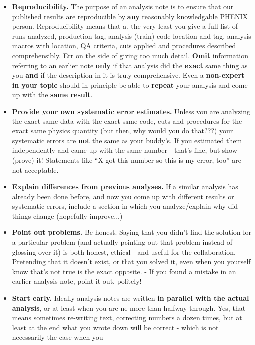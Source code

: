 \documentclass[12pt]{article}
\begin{document}
\begin{itemize}
\item{{\bf Reproducibility.}
  The purpose of an analysis note is to ensure that our published
  results are reproducible by {\bf any} reasonably knowledgable PHENIX
  person. 
  Reproducibility means that at the very least you give a full
  list of runs analyzed, production tag, analysis (train) code
  location and tag, analysis macros with location, QA criteria, cuts
  applied  and procedures  described comprehensibly.  Err on the side
  of giving too much detail.  {\bf Omit} information referring to an earlier 
  note {\bf only} if that analysis did
  the {\bf exact} same thing as you {\bf and} if the description in it is
  truly comprehensive.  Even a 
  {\bf non-expert in your topic} should in principle be able to
  {\bf repeat} your analysis and come up with the {\bf same result}.}
\item{{\bf Provide your own systematic error estimates.}
  Unless you are analyzing the exact same data with the exact same
  code, cuts and procedures for the exact same physics quantity (but
  then, why would you do that???) your systematic errors are {\bf not}
  the same as your buddy's.  If you estimated them independently and
  came up with the same number - that's fine, but show (prove) it!  
  Statements like ``X got this number so this is my error, too'' are not 
  acceptable.}
\item{{\bf Explain differences from previous analyses.}
  If a similar analysis has already been done before, and now you
  come up with different results or systematic errors, include a
  section in which you analyze/explain
  why did things change (hopefully improve...)}
\item{{\bf Point out problems.}
  Be honest.  Saying that you didn't find the solution for a
  particular problem (and actually pointing out that problem instead
  of glossing over it) is both honest, ethical - and useful for the
  collaboration.  Pretending that it doesn't exist, or that you solved
  it, even when you yourself know that's not true is the exact
  opposite. - If you found a mistake in an earlier analysis note,
  point it out, politely!}
\item{{\bf Start early.}
  Ideally analysis notes are written {\bf in parallel with the
    actual analysis}, or at least when you are no more than halfway
  through.  Yes, that means sometimes re-writing text,
  correcting numbers a dozen times, but at least at the end what you
  wrote down will be correct - which is not necessarily the case when you
}
\end{itemize}
\end{document}
